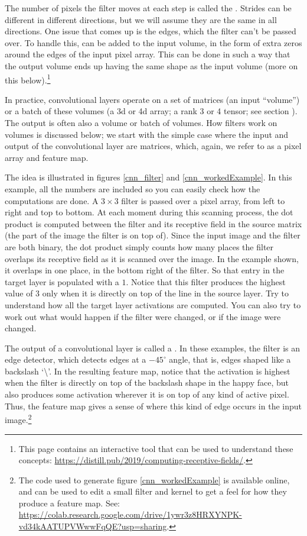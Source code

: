  The number of pixels the filter moves at each step is called the . Strides can be different in different directions, but we will assume they are the same in all directions. One issue that comes up is the edges, which the filter can't be passed over. To handle this,  can be added to the input volume, in the form of extra zeros around the edges of the input pixel array. This can be done in such a way that the output volume ends up having the same shape as the input volume (more on this below).\footnote{This page contains an interactive tool that can be used to understand these concepts: \url{https://distill.pub/2019/computing-receptive-fields/}.}

In practice, convolutional layers operate on a set of matrices  (an input ``volume'') or a batch of these volumes (a 3d or 4d array; a rank 3 or 4 tensor; see section ). The output is often also a volume or batch of volumes. How filters work on volumes is discussed below; we start with the simple case where the input and output of the convolutional layer are matrices, which, again, we refer to as a pixel array and feature map.

The idea is illustrated in figures \ref{cnn_filter} and \ref{cnn_workedExample}. In this example, all the numbers are included so you can easily check how the computations are done. A $3 \times 3$ filter is passed over a pixel array, from left to right and top to bottom. At each moment during this scanning process, the dot product is computed between the filter and its receptive field in the source matrix (the part of the image the filter is on top of). Since the input image and the filter are both binary, the dot product simply counts how many places the filter overlaps its receptive field as it is scanned over the image. In the example shown, it overlaps in one place, in the bottom right of the filter. So that entry in the target layer is populated with a $1$. Notice that this filter produces the highest value of $3$ only when it is directly on top of the line in the source layer. Try to understand how all the target layer activations are computed. You can also try to work out what would happen if the filter were changed, or if the image were changed.

The output of a convolutional layer is called a . In these examples, the filter is an edge detector, which detects edges at a $-45^\circ$ angle, that is, edges shaped like a backslash `\textbackslash'. In the resulting feature map, notice that the activation is highest when the filter is directly on top of the backslash shape in the happy face, but also produces some activation wherever it is on top of any kind of active pixel. Thus, the feature map gives a sense of where this kind of edge occurs in the input image.\footnote{The code used to generate figure \ref{cnn_workedExample} is available online, and can be used to edit a small filter and kernel to get a feel for how they produce a feature map. See: \url{https://colab.research.google.com/drive/1ywr3z8HRXYNPK-vd34kAATUPVWwwFqQE?usp=sharing}.}

